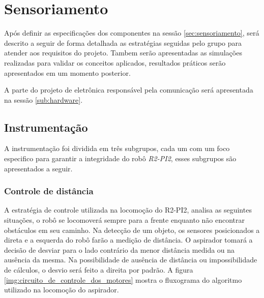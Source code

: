 \section{Sensoriamento} %
\label{sec:sensoriamento2}

	Após definir as especificações dos componentes na sessão \ref{sec:sensoriamento}, será descrito a seguir de forma detalhada as estratégias seguidas pelo grupo para atender aos requisitos do projeto. Tambem serão apresentadas as simulações realizadas para validar os conceitos aplicados, resultados práticos serão apresentados em um momento posterior.

	A parte do projeto de eletrônica responsável pela comunicação será apresentada na sessão \ref{sub:hardware}.

	\subsection{Instrumentação} %
	\label{sub:instrumentação2}
		A instrumentação foi dividida em três subgrupos, cada um com um foco especifico para garantir a integridade do robô \textit{R2-PI2}, esses subgrupos são apresentados a seguir.

		\subsubsection{Controle de distância}
		\label{sub:Controle_de_distância}
		A estratégia de controle utilizada na locomoção do R2-PI2, analisa as seguintes situações, o robô se locomoverá sempre para a frente enquanto não encontrar obstáculos em seu caminho. Na detecção de um objeto, os sensores posicionados a direta e a esquerda do robô farão a medição de distância. O aspirador tomará a decisão de desviar para o lado contrário da menor distância medida ou na ausência da mesma. Na possibilidade de ausência de distância ou impossibilidade de cálculos, o desvio será feito a direita por padrão. A figura \ref{img:circuito_de_controle_dos_motores} mostra o fluxograma do algoritmo utilizado na locomoção do aspirador.

